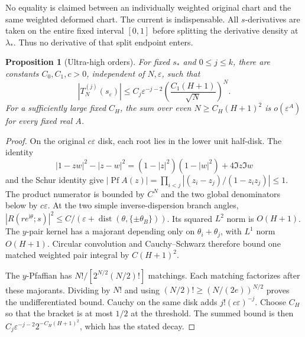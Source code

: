 \documentclass[11pt]{article}
\numberwithin{equation}{section}
\newtheorem{proposition}[theorem]{Proposition}
\theoremstyle{definition}
\newcommand{\ii}{\mathrm i}
\newcommand{\eps}{\varepsilon}
\newcommand{\Pf}{\operatorname{Pf}}
\newcommand{\dist}{\operatorname{dist}}
\newcommand{\sstar}{s_*}
\newcommand{\se}{s_\varepsilon}
\begin{document}
No equality is claimed between an individually weighted original chart
and the same weighted deformed chart. The current is indispensable.
All \(s\)-derivatives are taken on the entire fixed interval
\([0,1]\) before splitting the derivative density at \(\lambda_*\).
Thus no derivative of that split endpoint enters.

\begin{proposition}[Ultra-high orders]\label{prop:ultrahigh}
For fixed \(\sstar\) and \(0\le j\le k\), there are constants
\(C_0,C_1,c>0\), independent of \(N,\eps\), such that
\[
 |T_N^{(j)}(\se)|
 \le C_j\eps^{-j-2}\left(\frac{C_1(H+1)}{\sqrt N}\right)^N.
\]
For a sufficiently large fixed \(C_H\),
the sum over even \(N\ge C_H(H+1)^2\) is \(o(\eps^A)\)
for every fixed real \(A\).
\end{proposition}
\begin{proof}
On the original \(c\eps\) disk, each root lies in the lower unit
half-disk. The identity
\[
 |1-zw|^2-|z-w|^2=(1-|z|^2)(1-|w|^2)+4\Im z\Im w
\]
and the Schur identity give
\(|\Pf A(z)|=\prod_{i<j}|(z_i-z_j)/(1-z_iz_j)|\le1\).
The product numerator is bounded by \(C^N\) and the two global
denominators below by \(c\eps\).
At the two simple inverse-dispersion branch angles,
\(|R(re^{\ii\theta};s)|^2\le C/(\eps+\dist(\theta,\{\pm\theta_B\}))\).
Its squared \(L^2\) norm is \(O(H+1)\). The \(y\)-pair kernel has a
majorant depending only on \(\theta_i+\theta_j\), with \(L^1\) norm
\(O(H+1)\). Circular convolution and Cauchy--Schwarz therefore bound
one matched weighted pair integral by \(C(H+1)^2\).

The \(y\)-Pfaffian has \(N!/[2^{N/2}(N/2)!]\) matchings.
Each matching factorizes after these majorants. Dividing by \(N!\)
and using \((N/2)!\ge(N/(2e))^{N/2}\) proves the undifferentiated
bound. Cauchy on the same disk adds \(j!(c\eps)^{-j}\).
Choose \(C_H\) so that the bracket is at most \(1/2\) at the threshold.
The summed bound is then
\(C_j\eps^{-j-2}2^{-C_H(H+1)^2}\), which has the stated decay.
\end{proof}
\end{document}
